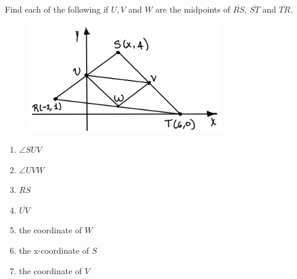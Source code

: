 \vspace{2cm}
\begin{exer}
    Find each of the following if $U, V$ and $W$ are the midpoints of $\overline{RS}$, $\overline{ST}$ and $\overline{TR}$.
    \begin{multicols}{2}
        \begin{figure}[H]
            \center
            \includegraphics[width=8.5cm]{content/img3.png}
        \end{figure}
        \begin{enumerate}
            \item $\angle SUV$
            \item $\angle UVW$
            \item $\overline{RS}$
            \item $\overline{UV}$
            \item the coordinate of $W$
            \item the x-coordinate of $S$
            \item the coordinate of $V$
        \end{enumerate}
    \end{multicols}
\end{exer}
